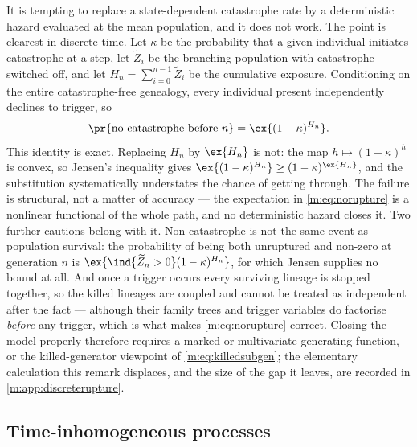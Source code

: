 \begin{remark}
\label{m:rem:notmeanfield}
It is tempting to replace a state-dependent catastrophe rate by a deterministic
hazard evaluated at the mean population, and it does not work. The point is
clearest in discrete time. Let $\kappa$ be the probability that a given individual
initiates catastrophe at a step, let $\widetilde Z_i$ be the branching population
with catastrophe switched off, and let $H_n=\sum_{i=0}^{n-1}\widetilde Z_i$ be the
cumulative exposure. Conditioning on the entire catastrophe-free genealogy, every
individual present independently declines to trigger, so
\begin{equation}
\label{m:eq:norupture}
\pr{\text{no catastrophe before }n} = \ex{(1-\kappa)^{H_n}} .
\end{equation}
This identity is exact. Replacing $H_n$ by $\ex{H_n}$ is not: the map
$h\mapsto(1-\kappa)^h$ is convex, so Jensen's inequality gives
$\ex{(1-\kappa)^{H_n}}\ge(1-\kappa)^{\ex{H_n}}$, and the substitution
systematically understates the chance of getting through. The failure is
structural, not a matter of accuracy --- the expectation in \cref{m:eq:norupture} is
a nonlinear functional of the whole path, and no deterministic hazard closes it.
Two further cautions belong with it. Non-catastrophe is not the same event as
population survival: the probability of being both unruptured and non-zero at
generation $n$ is $\ex{\ind\{\widetilde Z_n>0\}(1-\kappa)^{H_n}}$, for which
Jensen supplies no bound at all. And once a trigger occurs every surviving lineage
is stopped together, so the killed lineages are coupled and cannot be treated as
independent after the fact --- although their family trees and trigger variables do
factorise \emph{before} any trigger, which is what makes \cref{m:eq:norupture}
correct. Closing the model properly therefore requires a marked or multivariate
generating function, or the killed-generator viewpoint of \cref{m:eq:killedsubgen};
the elementary calculation this remark displaces, and the size of the gap it leaves,
are recorded in \cref{m:app:discreterupture}.
\end{remark}

\subsection{Time-inhomogeneous processes}
\label{m:sec:inhomogeneous}

